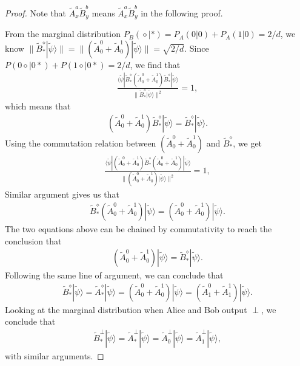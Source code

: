 \documentclass[11pt,letterpaper]{article}
\newcommand{\ket}[1]{|#1\rangle}
\newcommand{\bra}[1]{\langle#1|}
\newcommand{\1}{\mathbb{1}}
\newcommand{\tA}{\tilde{A}}
\newcommand{\tB}{\tilde{B}}
\newcommand{\tpsi}{\tilde{\psi}}
\newcommand{\pr}[2]{P(#1|#2)}
\newcommand{\pa}[2]{P_A(#1|#2)}
\newcommand{\pb}[2]{P_B(#1|#2)}
\theoremstyle{definition}
\begin{document}
\begin{proof}
Note that $\tA_x^a \tB_y^b$ means $\tA_x^a \tB_y^b$ in the following proof.

From the marginal distribution $\pb{\diamond}{\ast} = \pa{0}{0}+\pa{1}{0} = 2/d$,
we know $\| \tB_\ast^\diamond \ket{\tpsi} \| = \| (\tA_0^0+\tA_0^1) \ket{\tpsi}\| = \sqrt{2/d}$.
Since $\pr{0\diamond}{0\ast} + \pr{1\diamond}{0\ast} = 2/d$, we find that 
\begin{align*}
	\frac{\bra{\tpsi}\tB_\ast^\diamond (\tA_0^0+\tA_0^1) \tB_\ast^\diamond\ket{\tpsi}}{ \| \tB_\ast^\diamond \ket{\tpsi} \|^2} = 1,
\end{align*}
which means that 
\begin{align}
	(\tA_0^0+\tA_0^1)\tB_\ast^\diamond \ket{\tpsi} = \tB_\ast^\diamond \ket{\tpsi}.
\end{align}
Using the commutation relation between $(\tA_0^0+\tA_0^1)$ and $\tB_\ast^\diamond$, we get
\begin{align*}
	\frac{\bra{\tpsi} (\tA_0^0+\tA_0^1) \tB_\ast^\diamond(\tA_0^0+\tA_0^1)\ket{\tpsi}}{ \| (\tA_0^0+\tA_0^1) \ket{\tpsi} \|^2} = 1,
\end{align*}
Similar argument gives us that 
\begin{align}
	\tB_\ast^\diamond (\tA_0^0+\tA_0^1) \ket{\tpsi} = (\tA_0^0+\tA_0^1)\ket{\tpsi}.
\end{align}
The two equations above can be chained by commutativity to reach the conclusion that 
\begin{align}
	(\tA_0^0+\tA_0^1)\ket{\tpsi} = \tB_\ast^\diamond \ket{\tpsi}.
\end{align}
Following the same line of argument, we can conclude that
\begin{align}
	\tB_\ast^\diamond \ket{\tpsi} = \tA_\ast^\diamond \ket{\tpsi} = (\tA_0^0+\tA_0^1)\ket{\tpsi} = (\tA_1^0+\tA_1^1)\ket{\tpsi}.
\end{align}
Looking at the marginal distribution when Alice and Bob output $\perp$, we conclude that 
\begin{align}
	\tB_\ast^\perp \ket{\tpsi} = \tA_\ast^\perp \ket{\tpsi} = \tA_0^\perp \ket{\tpsi} = \tA_1^\perp \ket{\tpsi},
\end{align}
with similar arguments.


\end{proof}
\end{document}
